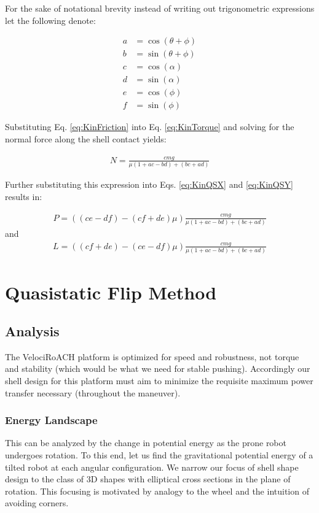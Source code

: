 \documentclass[letterpaper]{report}
\begin{document}
For the sake of notational brevity instead of writing out trigonometric expressions let the following denote:

\begin{align}
  a &= \cos(\theta + \phi) \\
  b &= \sin(\theta + \phi) \\
  c &= \cos(\alpha) \\
  d &= \sin(\alpha) \\
  e &= \cos(\phi) \\
  f &= \sin(\phi)
\end{align}

Substituting Eq. \ref{eq:KinFriction} into Eq. \ref{eq:KinTorque} and solving for the normal force along the shell contact yields:

\begin{align}
N = \frac{c m g}{\mu (1+ac-bd) + (bc+ad)}
\end{align}

Further substituting this expression into Eqs. \ref{eq:KinQSX} and \ref{eq:KinQSY} results in:

\begin{align}
P = ( (ce-df) - (cf+de)\mu ) \frac{c m g}{\mu (1+ac-bd) + (bc+ad)}
\end{align}
and
\begin{align}
L = ( (cf+de) - (ce-df)\mu )\frac{c m g}{\mu (1+ac-bd) + (bc+ad)}
\end{align}

\section{Quasistatic Flip Method}

\subsection{Analysis}
The VelociRoACH platform is optimized for speed and robustness, not torque and stability (which would be what we need for stable pushing).
Accordingly our shell design for this platform must aim to minimize the requisite maximum power transfer necessary (throughout the maneuver).

\subsubsection{Energy Landscape}
This can be analyzed by the change in potential energy as the prone robot undergoes rotation.
To this end, let us find the gravitational potential energy of a tilted robot at each angular configuration.
We narrow our focus of shell shape design to the class of 3D shapes with elliptical cross sections in the plane of rotation.
This focusing is motivated by analogy to the wheel and the intuition of avoiding corners.
\end{document}
